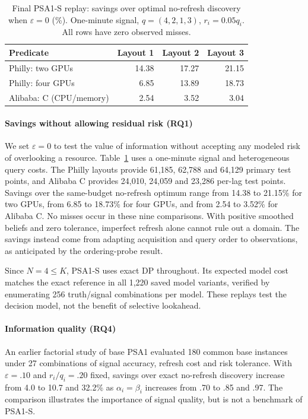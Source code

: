 \documentclass[conference]{IEEEtran}
\begin{document}
\begin{table}[t]
\caption{Final PSA1-S replay: savings over optimal no-refresh discovery when $\varepsilon=0$ (\%). One-minute signal, $q=(4,2,1,3)$, $r_i=0.05q_i$. All rows have zero observed misses.}
\label{tab:tracezero}
\centering
\begin{tabular}{lrrr}\hline
 Predicate & Layout 1 & Layout 2 & Layout 3\\\hline
 Philly: two GPUs & 14.38 & 17.27 & 21.15\\
 Philly: four GPUs & 6.85 & 13.89 & 18.73\\
 Alibaba: C (CPU/memory) & 2.54 & 3.52 & 3.04\\\hline
\end{tabular}
\end{table}
\paragraph{Savings without allowing residual risk (RQ1)}
We set $\varepsilon=0$ to test the value of information without accepting any modeled risk of overlooking a resource. Table~\ref{tab:tracezero} uses a one-minute signal and heterogeneous query costs. The Philly layouts provide 61,185, 62,788 and 64,129 primary test points, and Alibaba C provides 24,010, 24,059 and 23,286 per-lag test points. Savings over the same-budget no-refresh optimum range from 14.38 to 21.15\% for two GPUs, from 6.85 to 18.73\% for four GPUs, and from 2.54 to 3.52\% for Alibaba C. No misses occur in these nine comparisons. With positive smoothed beliefs and zero tolerance, imperfect refresh alone cannot rule out a domain. The savings instead come from adapting acquisition and query order to observations, as anticipated by the ordering-probe result.

Since $N=4\le K$, PSA1-S uses exact DP throughout. Its expected model cost matches the exact reference in all 1,220 saved model variants, verified by enumerating 256 truth/signal combinations per model. These replays test the decision model, not the benefit of selective lookahead.

\paragraph{Information quality (RQ4)}
An earlier factorial study of base PSA1 evaluated 180 common base instances under 27 combinations of signal accuracy, refresh cost and risk tolerance. With $\varepsilon=.10$ and $r_i/q_i=.20$ fixed, savings over exact no-refresh discovery increase from 4.0 to 10.7 and 32.2\% as $\alpha_i=\beta_i$ increases from .70 to .85 and .97. The comparison illustrates the importance of signal quality, but is not a benchmark of PSA1-S.
\end{document}
